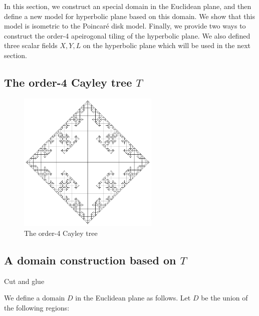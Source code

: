 In this section, we construct an special domain in the Euclidean plane, and then define a new model for hyperbolic plane based on this domain.
We show that this model is isometric to the Poincar\'e disk model. Finally, we provide two ways to construct the order-4 apeirogonal tiling of the hyperbolic plane.
We also defined three scalar fields $X, Y, L$ on the hyperbolic plane which will be used in the next section.

\subsection{The order-4 Cayley tree $T$}\label{sec:tree}

\begin{figure}
    \centering
    \includegraphics[width=0.6\textwidth]{images/cayley4}
    \caption{The order-4 Cayley tree}
\end{figure}


\subsection{A domain construction based on $T$}\label{sec:domain}

Cut and glue

We define a domain $D$ in the Euclidean plane as follows. Let $D$ be the union of the following regions:


